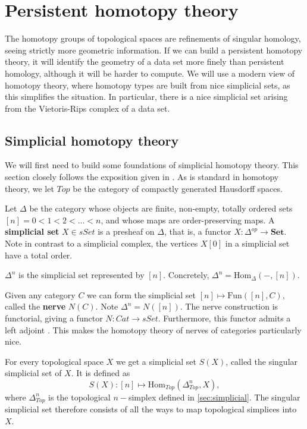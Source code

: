 \section{Persistent homotopy theory}
The homotopy groups of topological spaces are refinements of singular homology, seeing strictly more geometric information. If we can build a persistent homotopy theory, it will identify the geometry of a data set more finely than persistent homology, although it will be harder to compute. We will use a modern view of homotopy theory, where homotopy types are built from nice simplicial sets, as this simplifies the situation. In particular, there is a nice simplicial set arising from the Vietoris-Rips complex of a data set.

\subsection{Simplicial homotopy theory} We will first need to build some foundations of simplicial homotopy theory. This section closely follows the exposition given in \cite{Land}. As is standard in homotopy theory, we let $Top$ be the category of compactly generated Hausdorff spaces.

Let $\Delta$ be the category whose objects are finite, non-empty, totally ordered sets $[n]=0<1<2<\dots<n$, and whose maps are order-preserving maps. A \textbf{simplicial set} $X\in sSet$ is a presheaf on $\Delta$, that is, a functor $X:\Delta^{op}\rightarrow \textbf{Set}$. Note in contrast to a simplicial complex, the vertices $X[0]$ in a simplicial set have a total order.
\begin{example}
    $\Delta^n$ is the simplicial set represented by $[n].$ Concretely, $\Delta^n=\text{Hom}_\Delta(-,[n])$.
\end{example}

\begin{example}
    Given any category $C$ we can form the simplicial set $[n]\mapsto \text{Fun}([n],C)$, called the \textbf{nerve} $N(C).$ Note $\Delta^n=N([n]).$ The nerve construction is functorial, giving a functor $N:Cat\rightarrow sSet$. Furthermore, this functor admits a left adjoint \cite{Land}. This makes the homotopy theory of nerves of categories particularly nice.
\end{example}

For every topological space $X$ we get a simplicial set $S(X)$, called the singular simplicial set of $X$. It is defined as
$$S(X):[n]\mapsto\text{Hom}_{Top}(\Delta^n_{Top},X),$$
where $\Delta^n_{Top}$ is the topological $n-$simplex defined in \ref{sec:simplicial}.
The singular simplicial set therefore consists of all the ways to map topological simplices into $X$.


